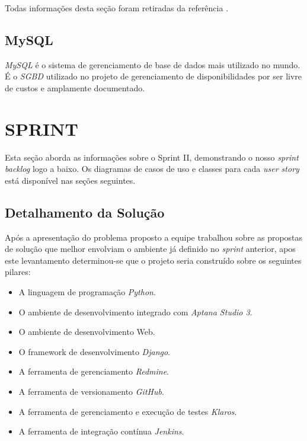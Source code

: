 \documentclass{abnt}
\begin{document}
			Todas informações desta seção foram retiradas da referência \cite{KLAROS}.
			
	\section{MySQL}

		\emph{MySQL} é o sistema de gerenciamento de base de dados mais utilizado no mundo.
		É o \emph{SGBD} utilizado no projeto de gerenciamento de disponibilidades por ser livre de custos
		e amplamente documentado.\cite{MYSQLWIKI}
	
\clearpage

\chapter{SPRINT}
	
		Esta seção aborda as informações sobre o Sprint II, demonstrando o nosso \emph{sprint backlog} logo a baixo. Os diagramas de casos de uso e classes para cada \emph{user story} está disponível nas seções seguintes.
	
	\section{Detalhamento da Solução}
	
		Após a apresentação do problema proposto a equipe trabalhou sobre as propostas de solução que melhor envolviam o ambiente já definido no \emph{sprint} anterior,
		apos este levantamento determinou-se que o projeto seria construído sobre os seguintes pilares:
		\begin{itemize}
		\item  A linguagem de programação \emph{Python}.
		\item O ambiente de desenvolvimento integrado com \emph{Aptana Studio 3}.
		\item O ambiente de desenvolvimento Web.
		\item  O framework de desenvolvimento \emph{Django}.
		\item  A ferramenta de gerenciamento \emph{Redmine}.
		\item  A ferramenta de versionamento \emph{GitHub}.
		\item  A ferramenta de gerenciamento e execução de testes \emph{Klaros}.
		\item  A ferramenta de integração contínua \emph{Jenkins}.
		\end{itemize}
		
\end{document}
